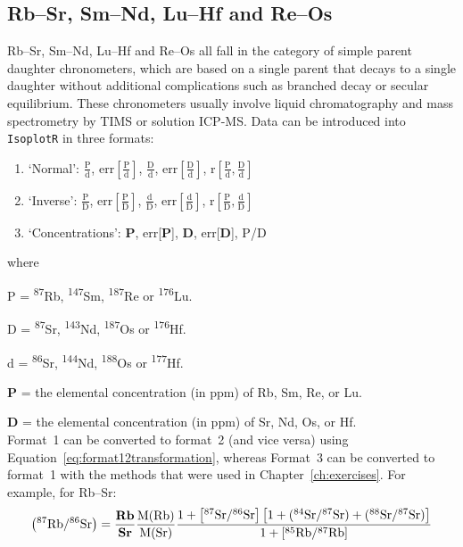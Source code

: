 \begin{refsection}

\chapter{Rb--Sr, Sm--Nd, Lu--Hf and Re--Os}\label{ch:PD}

Rb--Sr, Sm--Nd, Lu--Hf and Re--Os all fall in the category of simple
parent daughter chronometers, which are based on a single parent that
decays to a single daughter without additional complications such as
branched decay or secular equilibrium. These chronometers usually
involve liquid chromatography and mass spectrometry by TIMS or
solution ICP-MS. Data can be introduced into \texttt{IsoplotR} in
three formats:

\begin{enumerate}
\item{`Normal':}
  $\frac{\mbox{P}}{\mbox{d}}$,  
  $\mbox{err}\!\left[\frac{\mbox{P}}{\mbox{d}}\right]$, 
  $\frac{\mbox{D}}{\mbox{d}}$,  
  $\mbox{err}\!\left[\frac{\mbox{D}}{\mbox{d}}\right]$,  
  $\mbox{r}\!\left[\frac{\mbox{P}}{\mbox{d}},
  \frac{\mbox{D}}{\mbox{d}}\right]$
\item{`Inverse':}
  $\frac{\mbox{P}}{\mbox{D}}$,  
  $\mbox{err}\!\left[\frac{\mbox{P}}{\mbox{D}}\right]$, 
  $\frac{\mbox{d}}{\mbox{D}}$,  
  $\mbox{err}\!\left[\frac{\mbox{d}}{\mbox{D}}\right]$,  
  $\mbox{r}\!\left[\frac{\mbox{P}}{\mbox{D}},
  \frac{\mbox{d}}{\mbox{D}}\right]$
\item{`Concentrations':}
  \textbf{P}, err[\textbf{P}], \textbf{D}, err[\textbf{D}], P/D
\end{enumerate}

\noindent where

\noindent P = \textsuperscript{87}Rb, \textsuperscript{147}Sm,
\textsuperscript{187}Re or \textsuperscript{176}Lu.

\noindent D = \textsuperscript{87}Sr, \textsuperscript{143}Nd,
\textsuperscript{187}Os or \textsuperscript{176}Hf.

\noindent d = \textsuperscript{86}Sr, \textsuperscript{144}Nd,
\textsuperscript{188}Os or \textsuperscript{177}Hf.

\noindent \textbf{P} = the elemental concentration (in ppm) of Rb, Sm,
Re, or Lu.

\noindent \textbf{D} = the elemental concentration (in ppm) of Sr, Nd,
Os, or Hf.\\

Format~1 can be converted to format~2 (and vice versa) using
Equation~\ref{eq:format12transformation}, whereas Format~3 can be
converted to format~1 with the methods that were used in
Chapter~\ref{ch:exercises}. For example, for Rb--Sr:
\begin{equation}
  \left({}^{87}\mbox{Rb}/{}^{86}\mbox{Sr}\right) = 
  \frac{\mbox{\textbf{Rb}}}{\mbox{\textbf{Sr}}}
  \frac{\mbox{M(Rb)}}{\mbox{M(Sr)}}
  \frac{
    1+\left[{{}^{87}\mbox{Sr}}/{{}^{86}\mbox{Sr}}\right]
    \left[1+({}^{84}\mbox{Sr}/{}^{87}\mbox{Sr}) +
      ({}^{88}\mbox{Sr}/{}^{87}\mbox{Sr}) \right]
  }{
    1+[{}^{85}\mbox{Rb}/{}^{87}\mbox{Rb}]
  }
  \label{eq:ppm2ratios}
\end{equation}


\end{refsection}
